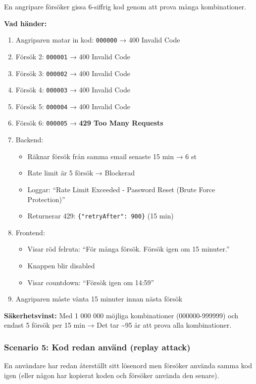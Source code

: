 \documentclass[12pt,a4paper]{article}
\begin{document}
En angripare försöker gissa 6-siffrig kod genom att prova många kombinationer.

\textbf{Vad händer:}
\begin{enumerate}[noitemsep]
  \item Angriparen matar in kod: \texttt{000000} → 400 Invalid Code
  \item Försök 2: \texttt{000001} → 400 Invalid Code
  \item Försök 3: \texttt{000002} → 400 Invalid Code
  \item Försök 4: \texttt{000003} → 400 Invalid Code
  \item Försök 5: \texttt{000004} → 400 Invalid Code
  \item Försök 6: \texttt{000005} → \textbf{429 Too Many Requests}
  \item Backend:
  \begin{itemize}[noitemsep]
    \item Räknar försök från samma email senaste 15 min → 6 st
    \item Rate limit är 5 försök → Blockerad
    \item Loggar: ``Rate Limit Exceeded - Password Reset (Brute Force Protection)''
    \item Returnerar 429: \texttt{\{"retryAfter": 900\}} (15 min)
  \end{itemize}
  \item Frontend:
  \begin{itemize}[noitemsep]
    \item Visar röd felruta: ``För många försök. Försök igen om 15 minuter.''
    \item Knappen blir disabled
    \item Visar countdown: ``Försök igen om 14:59''
  \end{itemize}
  \item Angriparen måste vänta 15 minuter innan nästa försök
\end{enumerate}

\textbf{Säkerhetsvinst:} Med 1 000 000 möjliga kombinationer (000000-999999) och endast 5 försök per 15 min → Det tar \textasciitilde{}95 år att prova alla kombinationer.

\subsubsection{Scenario 5: Kod redan använd (replay attack)}

En användare har redan återställt sitt lösenord men försöker använda samma kod igen (eller någon har kopierat koden och försöker använda den senare).
\end{document}
